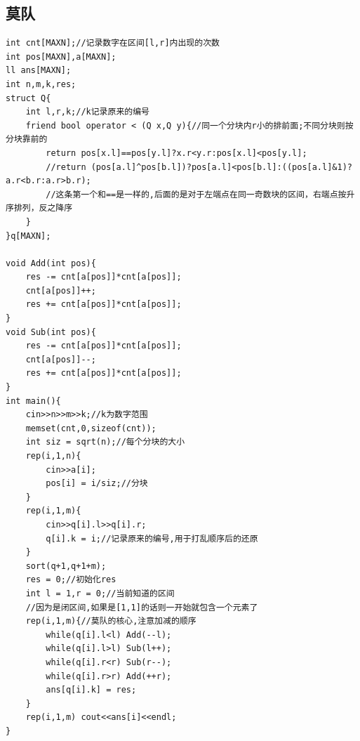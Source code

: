 \documentclass[a4]{ctexart}
\begin{document}
\subsection{莫队}
\begin{lstlisting}
int cnt[MAXN];//记录数字在区间[l,r]内出现的次数
int pos[MAXN],a[MAXN];
ll ans[MAXN];
int n,m,k,res;
struct Q{
    int l,r,k;//k记录原来的编号
    friend bool operator < (Q x,Q y){//同一个分块内r小的排前面;不同分块则按分块靠前的
        return pos[x.l]==pos[y.l]?x.r<y.r:pos[x.l]<pos[y.l];
        //return (pos[a.l]^pos[b.l])?pos[a.l]<pos[b.l]:((pos[a.l]&1)?a.r<b.r:a.r>b.r);
        //这条第一个和==是一样的,后面的是对于左端点在同一奇数块的区间，右端点按升序排列，反之降序
    }
}q[MAXN];

void Add(int pos){
    res -= cnt[a[pos]]*cnt[a[pos]];
    cnt[a[pos]]++;
    res += cnt[a[pos]]*cnt[a[pos]];
}
void Sub(int pos){
    res -= cnt[a[pos]]*cnt[a[pos]];
    cnt[a[pos]]--;
    res += cnt[a[pos]]*cnt[a[pos]];
}
int main(){
    cin>>n>>m>>k;//k为数字范围
    memset(cnt,0,sizeof(cnt));
    int siz = sqrt(n);//每个分块的大小
    rep(i,1,n){
        cin>>a[i];
        pos[i] = i/siz;//分块
    }
    rep(i,1,m){
        cin>>q[i].l>>q[i].r;
        q[i].k = i;//记录原来的编号,用于打乱顺序后的还原
    }
    sort(q+1,q+1+m);
    res = 0;//初始化res
    int l = 1,r = 0;//当前知道的区间
    //因为是闭区间,如果是[1,1]的话则一开始就包含一个元素了
    rep(i,1,m){//莫队的核心,注意加减的顺序
        while(q[i].l<l) Add(--l);
        while(q[i].l>l) Sub(l++);
        while(q[i].r<r) Sub(r--);
        while(q[i].r>r) Add(++r);
        ans[q[i].k] = res;
    }
    rep(i,1,m) cout<<ans[i]<<endl;
}	
\end{lstlisting}
\end{document}
